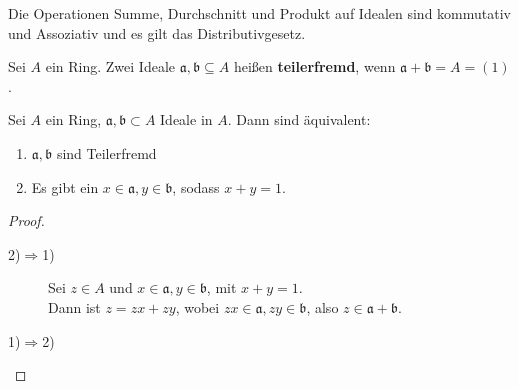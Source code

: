	\begin{satz}
		Die Operationen Summe, Durchschnitt und Produkt auf Idealen sind kommutativ und Assoziativ und es gilt das Distributivgesetz.
	\end{satz}

	\begin{definition}
		Sei $A$ ein Ring. Zwei Ideale $\mathfrak a,\mathfrak b\subseteq A$ heißen \textbf{teilerfremd}, wenn $\mathfrak a+\mathfrak b=A=(1)$.
	\end{definition}

	\begin{satz}
		Sei $A$ ein Ring, $\mathfrak a,\mathfrak b\subset A$ Ideale in $A$. Dann sind äquivalent:
		\begin{enumerate}
			\item $\mathfrak a,\mathfrak b$ sind Teilerfremd
			\item Es gibt ein $x\in\mathfrak a,y\in\mathfrak b$, sodass $x+y=1$.
		\end{enumerate}
	\end{satz}
	\begin{proof}
		\begin{description}
			\item[2)$\Rightarrow$1)] Sei $z\in A$ und $x\in\mathfrak a,y\in\mathfrak b$, mit $x+y=1$.\\
			Dann ist $z=zx+zy$, wobei $zx\in\mathfrak a,zy\in\mathfrak b$, also $z\in\mathfrak a+\mathfrak b$.
			\item[1)$\Rightarrow$2)] 
		\end{description}
	\end{proof}
	

